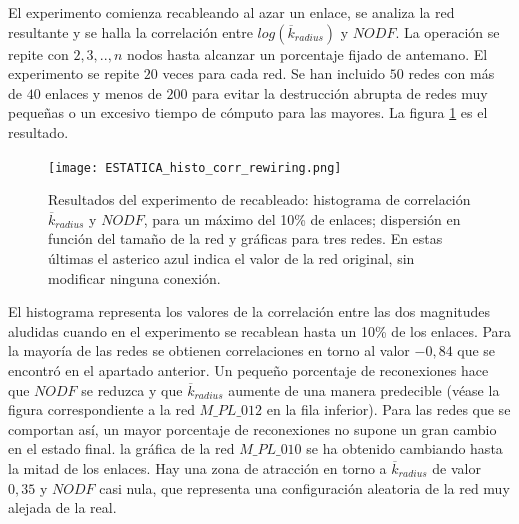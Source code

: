 El experimento comienza recableando al azar un enlace, se analiza la red resultante y se halla la correlación entre $log(\overline {k}_{radius})$  y $NODF$. La operación se repite con $2,3,..,n$ nodos hasta alcanzar un porcentaje fijado de antemano. El experimento se repite $20$ veces para cada red. Se han incluido $50$  redes con más de $40$ enlaces y menos de $200$ para evitar la destrucción abrupta de redes muy pequeñas o un excesivo tiempo de cómputo para las mayores. La figura \ref{fig:ESTATICA_histo_corr_rewiring} es el resultado.

\begin{figure}[h!]
\centering
\texttt{[image: ESTATICA\_histo\_corr\_rewiring.png]}
\caption {Resultados del experimento de recableado: histograma de correlación $\overline {k}_{radius}$ y $NODF$, para un máximo del 10\% de enlaces; dispersión en función del tamaño de la red y gráficas para tres redes. En estas últimas el asterico azul indica el valor de la red original, sin modificar ninguna conexión.}
\label{fig:ESTATICA_histo_corr_rewiring}
\end{figure}

El histograma representa los valores de la correlación entre las dos magnitudes aludidas cuando en el experimento se recablean hasta un 10\% de los enlaces. Para la mayoría de las redes se obtienen correlaciones en torno al valor $-0,84$ que se encontró en el apartado anterior. Un pequeño porcentaje de reconexiones hace que $NODF$ se reduzca y que $\overline {k}_{radius}$ aumente de una manera predecible (véase la figura correspondiente a la red $M\_PL\_012$ en la fila inferior). Para las redes que se comportan así, un mayor porcentaje de reconexiones no supone un gran cambio en el estado final. la gráfica de la red $M\_PL\_010$ se ha obtenido cambiando hasta la mitad de los enlaces. Hay una zona de atracción en torno a $\overline {k}_{radius}$ de valor $0,35$ y $NODF$ casi nula, que representa una configuración aleatoria de la red muy alejada de la real.

